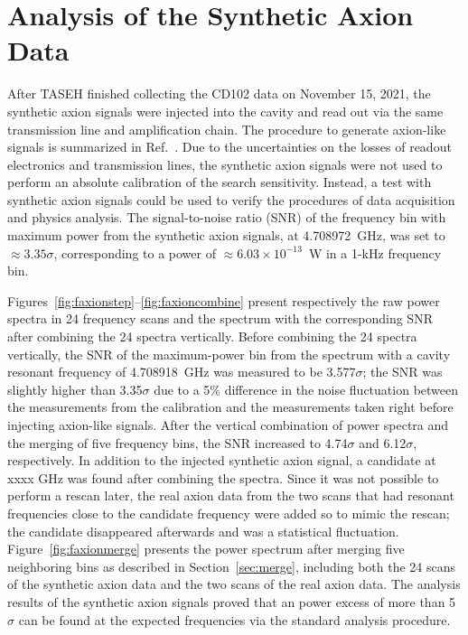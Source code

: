 \section{Analysis of the Synthetic Axion Data}
After TASEH finished collecting the CD102 data on November 15, 2021, 
the synthetic axion signals were injected into the cavity and read out via the 
same transmission line and amplification chain. The procedure 
to generate axion-like signals is summarized in 
Ref.~\cite{TASEHInstrumentation}. 
Due to the uncertainties on the losses of readout electronics and transmission
 lines, the synthetic axion signals were not used to perform an absolute 
calibration of the search sensitivity. Instead, 
a test with synthetic axion signals could be used to verify the procedures of 
data acquisition and physics analysis. The 
signal-to-noise ratio (SNR) of the frequency bin with maximum power from the 
synthetic axion signals, at 4.708972~GHz, was set to $\approx 3.35\sigma$, 
corresponding to a power of $\approx 6.03 \times 10^{-13}$~W in a 1-kHz 
frequency bin.  

Figures~\ref{fig:faxionstep}--\ref{fig:faxioncombine} present respectively the 
raw power spectra in 24 frequency scans and the spectrum with the corresponding 
SNR after combining the 24 spectra vertically. Before combining 
the 24 spectra vertically, the SNR of the maximum-power bin from the spectrum 
with a cavity resonant frequency of 4.708918~GHz was measured to be 
3.577$\sigma$; the SNR was slightly higher than 3.35$\sigma$ due to a 
5\% difference in the noise fluctuation between the measurements from 
the calibration and the measurements taken 
right before injecting axion-like signals. After the vertical combination 
of power spectra and the merging of five frequency bins, the SNR increased to 
4.74$\sigma$ and 6.12$\sigma$, respectively. In addition to the 
injected synthetic axion signal, a candidate at xxxx GHz was found after 
combining the spectra. Since it was not possible to perform a rescan later, 
the real axion data from the two scans that had resonant frequencies close to the 
candidate frequency were added so to mimic the rescan; the candidate 
 disappeared afterwards and was a statistical fluctuation.  
Figure~\ref{fig:faxionmerge} presents the power spectrum after merging five 
neighboring bins as described in Section~\ref{sec:merge}, 
including both the 24 scans of the synthetic axion data and the two scans 
of the real axion data. 
The analysis results of the synthetic axion signals proved that an power 
excess of more than 5$\sigma$ can be found at the expected frequencies via 
the standard analysis procedure.  


